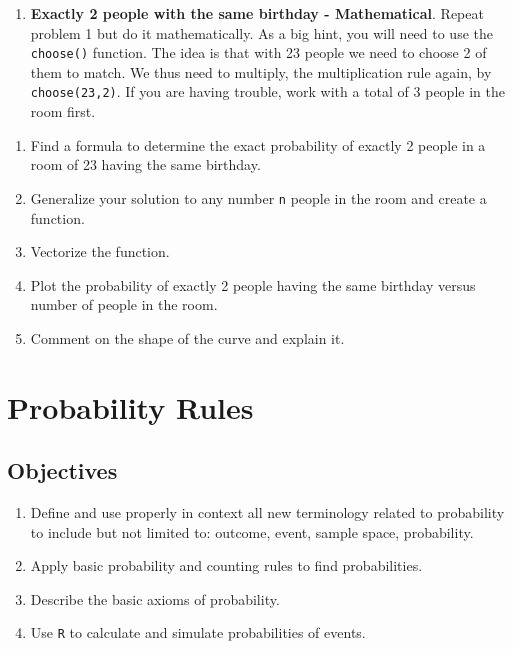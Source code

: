\documentclass[
]{book}
\providecommand{\tightlist}{%
  \setlength{\itemsep}{0pt}\setlength{\parskip}{0pt}}
\newcommand{\E}{\mbox{E}}
\newcommand{\Var}{\mbox{Var}}
\newcommand{\Cov}{\mbox{Cov}}
\newcommand{\Prob}{\mbox{P}}
\newcommand*\diff{\mathop{}\!\mathrm{d}}
\begin{document}
\begin{enumerate}
\def\labelenumi{\arabic{enumi}.}
\setcounter{enumi}{1}
\tightlist
\item
  \textbf{Exactly 2 people with the same birthday - Mathematical}. Repeat problem 1 but do it mathematically. As a big hint, you will need to use the \texttt{choose()} function. The idea is that with 23 people we need to choose 2 of them to match. We thus need to multiply, the multiplication rule again, by \texttt{choose(23,2)}. If you are having trouble, work with a total of 3 people in the room first.
\end{enumerate}

\begin{enumerate}
\def\labelenumi{\alph{enumi}.}
\tightlist
\item
  Find a formula to determine the exact probability of exactly 2 people in a room of 23 having the same birthday.\\
\item
  Generalize your solution to any number \texttt{n} people in the room and create a function.\\
\item
  Vectorize the function.\\
\item
  Plot the probability of exactly 2 people having the same birthday versus number of people in the room.\\
\item
  Comment on the shape of the curve and explain it.
\end{enumerate}

\hypertarget{PROBRULES}{%
\chapter{Probability Rules}\label{PROBRULES}}

\newcommand{\E}{\mbox{E}}
\newcommand{\Var}{\mbox{Var}}
\newcommand{\Cov}{\mbox{Cov}}
\newcommand{\Prob}{\mbox{P}}
\newcommand*\diff{\mathop{}\!\mathrm{d}}

\hypertarget{objectives-7}{%
\section{Objectives}\label{objectives-7}}

\begin{enumerate}
\def\labelenumi{\arabic{enumi})}
\tightlist
\item
  Define and use properly in context all new terminology related to probability to include but not limited to: outcome, event, sample space, probability.\\
\item
  Apply basic probability and counting rules to find probabilities.\\
\item
  Describe the basic axioms of probability.\\
\item
  Use \texttt{R} to calculate and simulate probabilities of events.
\end{enumerate}
\end{document}
